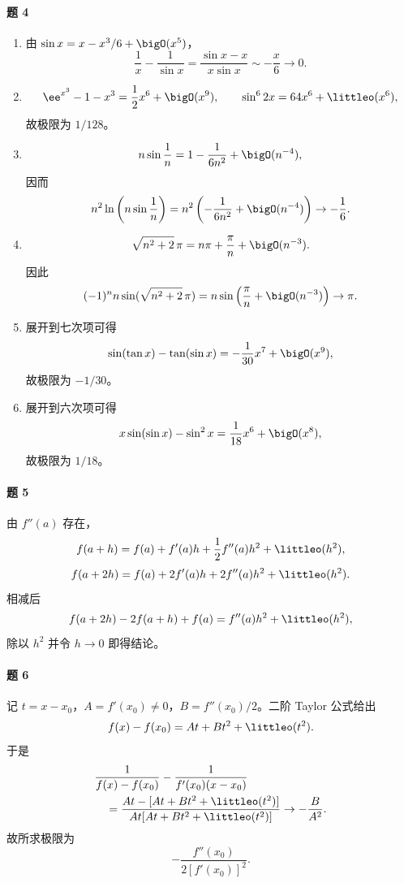 \paragraph{题 4}
\begin{xsolution}
\begin{enumerate}[label=(\arabic*)]
  \item 由 $\sin x=x-x^3/6+\bigO(x^5)$，
  \[
    \frac1x-\frac1{\sin x}
    =\frac{\sin x-x}{x\sin x}\sim-\frac x6\to0.
  \]

  \item
  \[
    \ee^{x^3}-1-x^3=\frac12x^6+\bigO(x^9),\qquad
    \sin^6 2x=64x^6+\littleo(x^6),
  \]
  故极限为 $1/128$。

  \item
  \[
    n\sin\frac1n=1-\frac1{6n^2}+\bigO(n^{-4}),
  \]
  因而
  \[
    n^2\ln\left(n\sin\frac1n\right)
    =n^2\left(-\frac1{6n^2}+\bigO(n^{-4})\right)\to-\frac16.
  \]

  \item
  \[
    \sqrt{n^2+2}\,\pi
    =n\pi+\frac\pi n+\bigO(n^{-3}).
  \]
  因此
  \[
    (-1)^n n\sin(\sqrt{n^2+2}\,\pi)
    =n\sin\left(\frac\pi n+\bigO(n^{-3})\right)\to\pi.
  \]

  \item 展开到七次项可得
  \[
    \sin(\tan x)-\tan(\sin x)=-\frac1{30}x^7+\bigO(x^9),
  \]
  故极限为 $-1/30$。

  \item 展开到六次项可得
  \[
    x\sin(\sin x)-\sin^2x=\frac1{18}x^6+\bigO(x^8),
  \]
  故极限为 $1/18$。
\end{enumerate}
\end{xsolution}

\paragraph{题 5}
\begin{xsolution}
由 $f''(a)$ 存在，
\[
  f(a+h)=f(a)+f'(a)h+\frac12f''(a)h^2+\littleo(h^2),
\]
\[
  f(a+2h)=f(a)+2f'(a)h+2f''(a)h^2+\littleo(h^2).
\]
相减后
\[
  f(a+2h)-2f(a+h)+f(a)=f''(a)h^2+\littleo(h^2),
\]
除以 $h^2$ 并令 $h\to0$ 即得结论。
\end{xsolution}

\paragraph{题 6}
\begin{xsolution}
记 $t=x-x_0$，$A=f'(x_0)\ne0$，$B=f''(x_0)/2$。二阶 Taylor 公式给出
\[
  f(x)-f(x_0)=At+Bt^2+\littleo(t^2).
\]
于是
\begin{align*}
  &\frac1{f(x)-f(x_0)}-\frac1{f'(x_0)(x-x_0)}\\
  &\quad=\frac{At-[At+Bt^2+\littleo(t^2)]}
  {At[At+Bt^2+\littleo(t^2)]}
  \to-\frac{B}{A^2}.
\end{align*}
故所求极限为
\[
  -\frac{f''(x_0)}{2[f'(x_0)]^2}.
\]
\end{xsolution}

